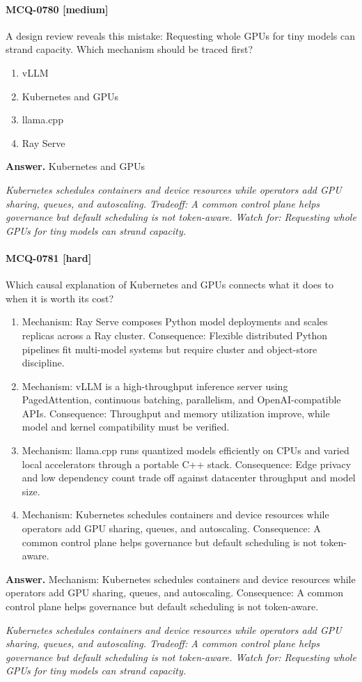 \paragraph{MCQ-0780 [medium]} A design review reveals this mistake: Requesting whole GPUs for tiny models can strand capacity. Which mechanism should be traced first?
\begin{enumerate}[label=\Alph*.]
\item vLLM
\item Kubernetes and GPUs
\item llama.cpp
\item Ray Serve
\end{enumerate}
\noindent\textbf{Answer.} Kubernetes and GPUs
\par\textit{Kubernetes schedules containers and device resources while operators add GPU sharing, queues, and autoscaling. Tradeoff: A common control plane helps governance but default scheduling is not token-aware. Watch for: Requesting whole GPUs for tiny models can strand capacity.}
\paragraph{MCQ-0781 [hard]} Which causal explanation of Kubernetes and GPUs connects what it does to when it is worth its cost?
\begin{enumerate}[label=\Alph*.]
\item Mechanism: Ray Serve composes Python model deployments and scales replicas across a Ray cluster. Consequence: Flexible distributed Python pipelines fit multi-model systems but require cluster and object-store discipline.
\item Mechanism: vLLM is a high-throughput inference server using PagedAttention, continuous batching, parallelism, and OpenAI-compatible APIs. Consequence: Throughput and memory utilization improve, while model and kernel compatibility must be verified.
\item Mechanism: llama.cpp runs quantized models efficiently on CPUs and varied local accelerators through a portable C++ stack. Consequence: Edge privacy and low dependency count trade off against datacenter throughput and model size.
\item Mechanism: Kubernetes schedules containers and device resources while operators add GPU sharing, queues, and autoscaling. Consequence: A common control plane helps governance but default scheduling is not token-aware.
\end{enumerate}
\noindent\textbf{Answer.} Mechanism: Kubernetes schedules containers and device resources while operators add GPU sharing, queues, and autoscaling. Consequence: A common control plane helps governance but default scheduling is not token-aware.
\par\textit{Kubernetes schedules containers and device resources while operators add GPU sharing, queues, and autoscaling. Tradeoff: A common control plane helps governance but default scheduling is not token-aware. Watch for: Requesting whole GPUs for tiny models can strand capacity.}
